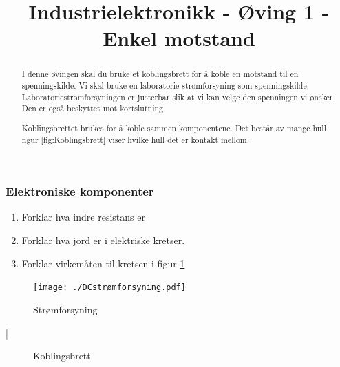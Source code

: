 \documentclass[12pt,a4paper]{article}
\begin{document}
\subsubsection{Elektroniske komponenter}
\begin{enumerate}
\item Forklar hva indre resistans er
\item Forklar hva jord er i elektriske kretser. 
\item Forklar virkemåten til kretsen i figur \ref{fig:Str=0000F8mforsyning} 
\end{enumerate}
\noindent \begin{center}
\begin{figure}
\noindent \begin{centering}
\texttt{[image: ./DCstrømforsyning.pdf]}
\par\end{centering}
\caption{\label{fig:Str=0000F8mforsyning}Strømforsyning}
\end{figure}
\par\end{center}

\newpage
 | 
\newpage
\title{Industrielektronikk - Øving 1 - Enkel motstand}
\maketitle
\begin{abstract}
I denne øvingen skal du bruke et koblingsbrett for å koble en motstand
til en spenningskilde. Vi skal bruke en laboratorie strømforsyning
som spenningskilde. Laboratoriestrømforsyningen er justerbar slik
at vi kan velge den spenningen vi ønsker. Den er også beskyttet mot
kortslutning. 

Koblingsbrettet brukes for å koble sammen komponentene. Det består
av mange hull figur \ref{fig:Koblingsbrett} viser hvilke hull det
er kontakt mellom.
\end{abstract}
\noindent \begin{center}
\begin{figure}[H]
\noindent \begin{centering}
\par\end{centering}
\noindent \begin{centering}
\par\end{centering}
\caption{\label{fig:Koblingsbrett}Koblingsbrett}
\end{figure}
\par\end{center}
\end{document}
